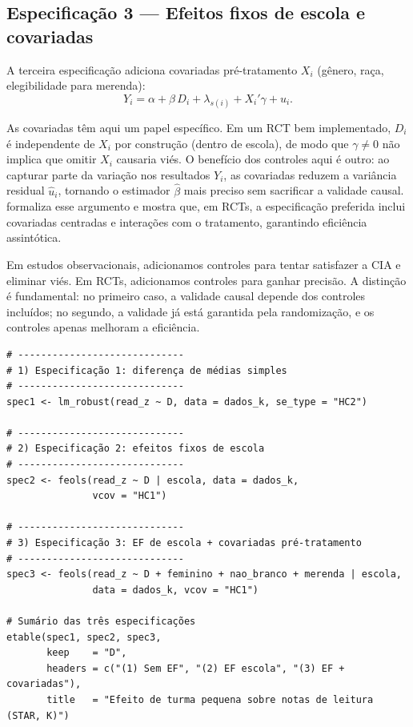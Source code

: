 \subsection*{Especificação 3 — Efeitos fixos de escola e covariadas}

A terceira especificação adiciona covariadas pré-tratamento $X_i$ (gênero, raça, elegibilidade para merenda):
\begin{equation}
  Y_i = \alpha + \beta\, D_i + \lambda_{s(i)} + X_i'\gamma + u_i.
  \label{eq:spec3}
\end{equation}

As covariadas têm aqui um papel específico. Em um RCT bem implementado, $D_i$ é independente de $X_i$ por construção (dentro de escola), de modo que $\gamma \neq 0$ não implica que omitir $X_i$ causaria viés. O benefício dos controles aqui é outro: ao capturar parte da variação nos resultados $Y_i$, as covariadas reduzem a variância residual $\hat{u}_i$, tornando o estimador $\hat{\beta}$ mais preciso sem sacrificar a validade causal. \citet{Lin2013} formaliza esse argumento e mostra que, em RCTs, a especificação preferida inclui covariadas centradas e interações com o tratamento, garantindo eficiência assintótica.

\begin{notabox}
Em estudos observacionais, adicionamos controles para tentar satisfazer a CIA e eliminar viés. Em RCTs, adicionamos controles para ganhar precisão. A distinção é fundamental: no primeiro caso, a validade causal depende dos controles incluídos; no segundo, a validade já está garantida pela randomização, e os controles apenas melhoram a eficiência.
\end{notabox}

\begin{lstlisting}[style=Rstyle, caption={Três especificações progressivas no STAR}]
# -----------------------------
# 1) Especificação 1: diferença de médias simples
# -----------------------------
spec1 <- lm_robust(read_z ~ D, data = dados_k, se_type = "HC2")

# -----------------------------
# 2) Especificação 2: efeitos fixos de escola
# -----------------------------
spec2 <- feols(read_z ~ D | escola, data = dados_k,
               vcov = "HC1")

# -----------------------------
# 3) Especificação 3: EF de escola + covariadas pré-tratamento
# -----------------------------
spec3 <- feols(read_z ~ D + feminino + nao_branco + merenda | escola,
               data = dados_k, vcov = "HC1")

# Sumário das três especificações
etable(spec1, spec2, spec3,
       keep    = "D",
       headers = c("(1) Sem EF", "(2) EF escola", "(3) EF + covariadas"),
       title   = "Efeito de turma pequena sobre notas de leitura (STAR, K)")
\end{lstlisting}

